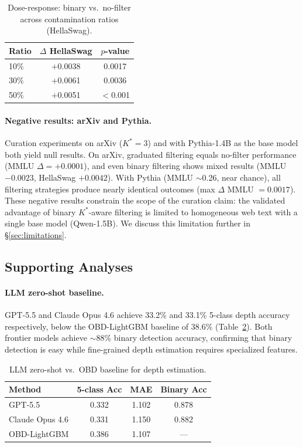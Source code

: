 \documentclass[11pt,a4paper]{article}
\begin{document}
\begin{table}[t]
\centering
\small
\caption{Dose-response: binary vs.\ no-filter across contamination ratios (HellaSwag).}
\label{tab:dose}
\begin{tabular}{lcc}
\toprule
Ratio & $\Delta$ HellaSwag & $p$-value \\
\midrule
10\% & $+$0.0038 & 0.0017 \\
30\% & $+$0.0061 & 0.0036 \\
50\% & $+$0.0051 & $<$0.001 \\
\bottomrule
\end{tabular}
\end{table}

\paragraph{Negative results: arXiv and Pythia.}
Curation experiments on arXiv ($K^*\!=\!3$) and with Pythia-1.4B as the base model both yield null results. On arXiv, graduated filtering equals no-filter performance (MMLU $\Delta = +0.0001$), and even binary filtering shows mixed results (MMLU $-0.0023$, HellaSwag $+0.0042$). With Pythia (MMLU $\sim$0.26, near chance), all filtering strategies produce nearly identical outcomes (max $\Delta$ MMLU $= 0.0017$). These negative results constrain the scope of the curation claim: the validated advantage of binary $K^*$-aware filtering is limited to homogeneous web text with a single base model (Qwen-1.5B). We discuss this limitation further in \S\ref{sec:limitations}.


\subsection{Supporting Analyses}

\paragraph{LLM zero-shot baseline.}\label{sec:llm_baseline}
GPT-5.5 and Claude Opus 4.6 achieve 33.2\% and 33.1\% 5-class depth accuracy respectively, below the OBD-LightGBM baseline of 38.6\% (Table~\ref{tab:llm_baseline}). Both frontier models achieve $\sim$88\% binary detection accuracy, confirming that binary detection is easy while fine-grained depth estimation requires specialized features.

\begin{table}[t]
\centering
\small
\caption{LLM zero-shot vs.\ OBD baseline for depth estimation.}
\label{tab:llm_baseline}
\begin{tabular}{lccc}
\toprule
Method & 5-class Acc & MAE & Binary Acc \\
\midrule
GPT-5.5         & 0.332 & 1.102 & 0.878 \\
Claude Opus 4.6 & 0.331 & 1.150 & 0.882 \\
OBD-LightGBM   & 0.386 & 1.107 &  ---  \\
\bottomrule
\end{tabular}
\end{table}
\end{document}
